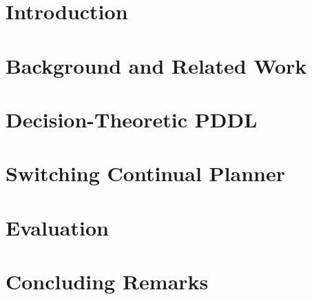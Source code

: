 \documentclass[letterpaper]{article}
\begin{document}
\section{Introduction}



\section{Background and Related Work}


\section{Decision-Theoretic PDDL}


\section{Switching Continual Planner}


\section{Evaluation}




\section{Concluding Remarks}





\end{document}
